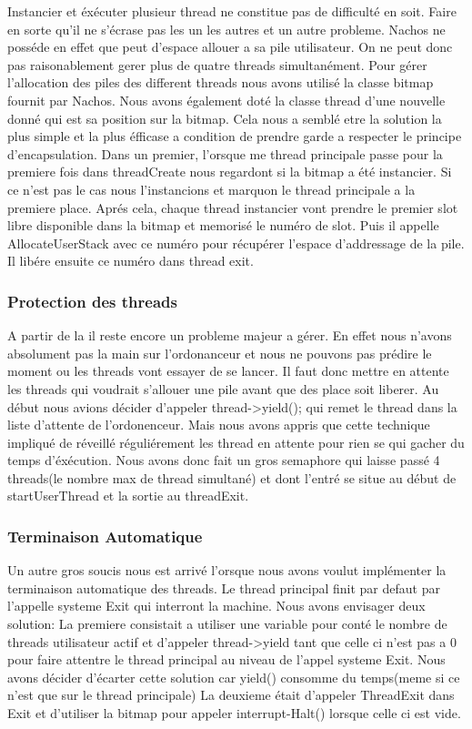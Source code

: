 \documentclass[12pt]{article}
\begin{document}
Instancier et éxécuter plusieur thread ne constitue pas de difficulté en soit.
Faire en sorte qu'il ne s'écrase pas les un les autres et un autre probleme.
Nachos ne posséde en effet que peut d'espace allouer a sa pile utilisateur.
On ne peut donc pas raisonablement gerer plus de quatre threads simultanément.
Pour gérer l'allocation des piles des different threads nous avons utilisé la classe
bitmap fournit par Nachos. Nous avons également doté la classe thread d'une nouvelle donné
qui est sa position sur la bitmap. Cela nous a semblé etre la solution la plus simple et
la plus éfficase a condition de prendre garde a respecter le principe d'encapsulation.
Dans un premier, l'orsque me thread principale passe pour la premiere fois dans threadCreate
nous regardont si la bitmap a été instancier. Si ce n'est pas le cas nous l'instancions
et marquon le thread principale a la premiere place.
Aprés cela, chaque thread instancier vont prendre le premier slot libre disponible dans
la bitmap et memorisé le numéro de slot. Puis il appelle AllocateUserStack avec ce
numéro pour récupérer l'espace d'addressage de la pile.
Il libére ensuite ce numéro dans thread exit.

\subsubsection{Protection des threads}

A partir de la il reste encore un probleme majeur a gérer. En effet nous n'avons absolument
pas la main sur l'ordonanceur et nous ne pouvons pas prédire le moment ou les threads
vont essayer de se lancer. Il faut donc mettre en attente les threads qui voudrait
s'allouer une pile avant que des place soit liberer. Au début nous avions décider
d'appeler thread->yield(); qui remet le thread dans la liste d'attente de l'ordonenceur.
Mais nous avons appris que cette technique impliqué de réveillé réguliérement les
thread en attente pour rien se qui gacher du temps d'éxécution.
Nous avons donc fait un gros semaphore qui laisse passé 4 threads(le nombre max de thread
simultané) et dont l'entré se situe au début de startUserThread et la sortie au threadExit.

\subsubsection{Terminaison Automatique}
Un autre gros soucis nous est arrivé l'orsque nous avons voulut implémenter la terminaison
automatique des threads. Le thread principal finit par defaut par l'appelle systeme Exit
qui interront la machine.
Nous avons envisager deux solution:
La premiere consistait a utiliser une variable pour conté le nombre de threads utilisateur actif
et d'appeler thread->yield tant que celle ci n'est pas a 0 pour faire attentre le thread principal
au niveau de l'appel systeme Exit. Nous avons décider d'écarter cette solution car yield()
consomme du temps(meme si ce n'est que sur le thread principale)
La deuxieme était d'appeler ThreadExit dans Exit et d'utiliser la bitmap pour appeler interrupt-Halt()
lorsque celle ci est vide.
\end{document}
